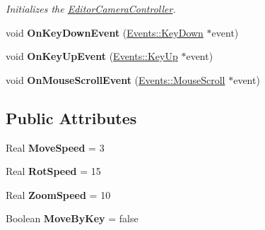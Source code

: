 \begin{DoxyCompactItemize}
\begin{DoxyCompactList}\small\item\em Initializes the \hyperlink{classDCEngine_1_1Components_1_1EditorCameraController}{Editor\-Camera\-Controller}. \end{DoxyCompactList}\item 
\hypertarget{classDCEngine_1_1Components_1_1EditorCameraController_a41ae801d449a38d59fc664ed8d195d26}{void {\bfseries On\-Key\-Down\-Event} (\hyperlink{classDCEngine_1_1Events_1_1KeyDown}{Events\-::\-Key\-Down} $\ast$event)}\label{classDCEngine_1_1Components_1_1EditorCameraController_a41ae801d449a38d59fc664ed8d195d26}

\item 
\hypertarget{classDCEngine_1_1Components_1_1EditorCameraController_a87bb1582402019f45d3f3d9ab00217e9}{void {\bfseries On\-Key\-Up\-Event} (\hyperlink{classDCEngine_1_1Events_1_1KeyUp}{Events\-::\-Key\-Up} $\ast$event)}\label{classDCEngine_1_1Components_1_1EditorCameraController_a87bb1582402019f45d3f3d9ab00217e9}

\item 
\hypertarget{classDCEngine_1_1Components_1_1EditorCameraController_a5501b098666103ad809b1cae1f33fe50}{void {\bfseries On\-Mouse\-Scroll\-Event} (\hyperlink{classDCEngine_1_1Events_1_1MouseScroll}{Events\-::\-Mouse\-Scroll} $\ast$event)}\label{classDCEngine_1_1Components_1_1EditorCameraController_a5501b098666103ad809b1cae1f33fe50}

\end{DoxyCompactItemize}
\subsection*{Public Attributes}
\begin{DoxyCompactItemize}
\item 
\hypertarget{classDCEngine_1_1Components_1_1EditorCameraController_ae525a67a1e964fa6b009d08352f84f6e}{Real {\bfseries Move\-Speed} = 3}\label{classDCEngine_1_1Components_1_1EditorCameraController_ae525a67a1e964fa6b009d08352f84f6e}

\item 
\hypertarget{classDCEngine_1_1Components_1_1EditorCameraController_a7c6152a28e9bf4abb87968ed51e2e99b}{Real {\bfseries Rot\-Speed} = 15}\label{classDCEngine_1_1Components_1_1EditorCameraController_a7c6152a28e9bf4abb87968ed51e2e99b}

\item 
\hypertarget{classDCEngine_1_1Components_1_1EditorCameraController_a89200569a704f5081cd7fbb676cb70ca}{Real {\bfseries Zoom\-Speed} = 10}\label{classDCEngine_1_1Components_1_1EditorCameraController_a89200569a704f5081cd7fbb676cb70ca}

\item 
\hypertarget{classDCEngine_1_1Components_1_1EditorCameraController_ab423680f89ba8f982761a0267cbb235b}{Boolean {\bfseries Move\-By\-Key} = false}\label{classDCEngine_1_1Components_1_1EditorCameraController_ab423680f89ba8f982761a0267cbb235b}

\end{DoxyCompactItemize}
